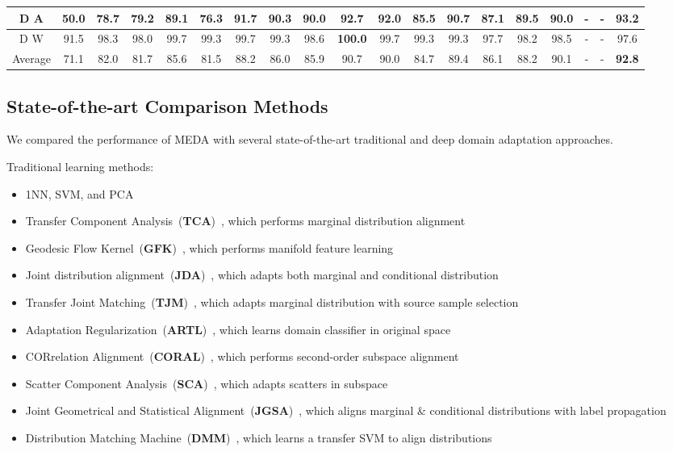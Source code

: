\documentclass[sigconf]{acmart}
\begin{document}
\begin{table*}[ht]
{\begin{tabular}{|c|c|c|c|c|c|c|c|c|c|c|c|c|c|c|c|c|c|c|}
			D  A & 50.0 & 78.7 & 79.2 & 89.1 & 76.3 & 91.7 & 90.3 & 90.0 & 92.7 & 92.0 & 85.5 & 90.7 & 87.1 & 89.5 & 90.0 & - & - & \textbf{93.2} \\ \hline
			D  W & 91.5 & 98.3 & 98.0 & 99.7 & 99.3 & 99.7 & 99.3 & 98.6 & \textbf{100.0} & 99.7 & 99.3 & 99.3 & 97.7 & 98.2 & 98.5 & - & - & 97.6 \\ \hline \hline
			Average & 71.1 & 82.0 & 81.7 & 85.6 & 81.5 & 88.2 & 86.0 & 85.9 & 90.7 & 90.0 & 84.7 & 89.4 & 86.1 & 88.2 & 90.1 & - & - & \textbf{92.8} \\ \hline	
		\end{tabular}
	}
\vspace{-.1in}
\end{table*}

\subsection{State-of-the-art Comparison Methods}
We compared the performance of MEDA with several state-of-the-art traditional and deep domain adaptation approaches.

Traditional learning methods:

\begin{itemize}[noitemsep,nolistsep]
	\item 1NN, SVM, and PCA
	\item Transfer Component Analysis~(\textbf{TCA})~\cite{pan2011domain}, which performs marginal distribution alignment
	\item Geodesic Flow Kernel~(\textbf{GFK})~\cite{gong2012geodesic}, which performs manifold feature learning
	\item Joint distribution alignment~(\textbf{JDA})~\cite{long2013transfer}, which adapts both marginal and conditional distribution
	\item Transfer Joint Matching~(\textbf{TJM})~\cite{long2014transfer}, which adapts marginal distribution with source sample selection
	\item Adaptation Regularization~(\textbf{ARTL})~\cite{long2014adaptation}, which learns domain classifier in original space
	\item CORrelation Alignment~(\textbf{CORAL})~\cite{sun2016return}, which performs second-order subspace alignment
	\item Scatter Component Analysis~(\textbf{SCA})~\cite{ghifary2017scatter}, which adapts scatters in subspace
	\item Joint Geometrical and Statistical Alignment~(\textbf{JGSA})~\cite{zhang2017joint}, which aligns marginal \& conditional distributions with label propagation
	\item Distribution Matching Machine~(\textbf{DMM})~\cite{cao2018unsupervised}, which learns a transfer SVM to align distributions
\end{itemize}
\end{document}
